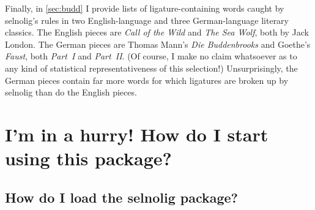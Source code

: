 \documentclass[11pt]{article}
\newcommand{\pkg}[1]{\textsf{#1}}
\begin{document}
Finally, in \cref{sec:budd} I provide lists of ligature-containing words caught by \pkg{selnolig}'s rules in two English-language and three German-language literary classics. The English pieces are \emph{Call of the Wild} and \emph{The Sea Wolf}, both by Jack London. The German pieces are Thomas Mann's \emph{Die Buddenbrooks} and Goethe's \emph{Faust}, both \emph{Part~I} and \emph{Part~II}. (Of course, I make no claim whatsoever as to any kind of statistical representativeness of this selection!) Unsurprisingly, the German pieces contain far more words for which ligatures are broken up by \pkg{selnolig} than do the English pieces. 



\section{I'm in a hurry! How do I start using this package?} \label{sec:hurry}

\subsection[How do I load the selnolig package?]{How do I load the \pkg{selnolig} package?}
\end{document}
